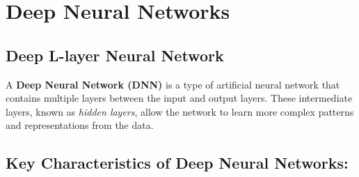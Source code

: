 \documentclass[letterpaper,12pt,notitlepage,twoside]{report}
\begin{document}
\section{Deep Neural Networks}
\subsection{Deep L-layer Neural Network}
A \textbf{Deep Neural Network (DNN)} is a type of artificial neural network that contains multiple layers between the input and output layers. These intermediate layers, known as \textit{hidden layers}, allow the network to learn more complex patterns and representations from the data.

\subsection*{Key Characteristics of Deep Neural Networks:}
\end{document}
